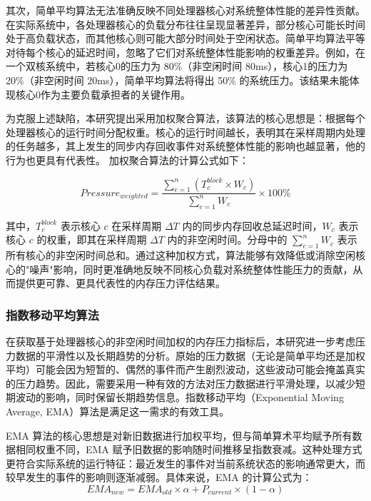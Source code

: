 其次，简单平均算法无法准确反映不同处理器核心对系统整体性能的差异性贡献。在实际系统中，各处理器核心的负载分布往往呈现显著差异，部分核心可能长时间处于高负载状态，而其他核心则可能大部分时间处于空闲状态。简单平均算法平等对待每个核心的延迟时间，忽略了它们对系统整体性能影响的权重差异。例如，在一个双核系统中，若核心0的压力为 80\%（非空闲时间 80ms），核心1的压力为 20\%（非空闲时间 20ms），简单平均算法将得出 50\% 的系统压力。该结果未能体现核心0作为主要负载承担者的关键作用。

为克服上述缺陷，本研究提出采用加权聚合算法，该算法的核心思想是：根据每个处理器核心的运行时间分配权重。核心的运行时间越长，表明其在采样周期内处理的任务越多，其上发生的同步内存回收事件对系统整体性能的影响也越显著，他的行为也更具有代表性。 加权聚合算法的计算公式如下：

\begin{equation}
    Pressure_{weighted} = \frac{\sum_{c=1}^{n} (T_c^{block} \times W_c)}{\sum_{c=1}^{n} W_c} \times 100\%
\end{equation}

其中，\(T_c^{block}\) 表示核心 \(c\) 在采样周期 \(\Delta T\) 内的同步内存回收总延迟时间，\(W_c\) 表示核心 \(c\) 的权重，即其在采样周期 \(\Delta T\) 内的非空闲时间。分母中的 \(\sum_{c=1}^{n} W_c\) 表示所有核心的非空闲时间总和。通过这种加权方式，算法能够有效降低或消除空闲核心的"噪声"影响，同时更准确地反映不同核心负载对系统整体性能压力的贡献，从而提供更可靠、更具代表性的内存压力评估结果。

\subsubsection{指数移动平均算法}

在获取基于处理器核心的非空闲时间加权的内存压力指标后，本研究进一步考虑压力数据的平滑性以及长期趋势的分析。原始的压力数据（无论是简单平均还是加权平均）可能会因为短暂的、偶然的事件而产生剧烈波动，这些波动可能会掩盖真实的压力趋势。因此，需要采用一种有效的方法对压力数据进行平滑处理，以减少短期波动的影响，同时保留长期趋势信息。指数移动平均（Exponential Moving Average, EMA）算法是满足这一需求的有效工具。

EMA 算法的核心思想是对新旧数据进行加权平均，但与简单算术平均赋予所有数据相同权重不同，EMA 赋予旧数据的影响随时间推移呈指数衰减。这种处理方式更符合实际系统的运行特征：最近发生的事件对当前系统状态的影响通常更大，而较早发生的事件的影响则逐渐减弱。具体来说，EMA 的计算公式为：
\begin{equation}
    EMA_{new} = EMA_{old} \times \alpha + P_{current} \times (1 - \alpha)
    \label{eq:EMA}
\end{equation}


